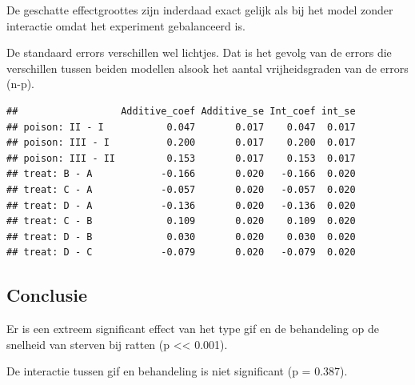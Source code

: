\documentclass[
  12pt,dutch]{book}
\newenvironment{Shaded}{\begin{snugshade}}{\end{snugshade}}
\newcommand{\AttributeTok}[1]{\textcolor[rgb]{0.13,0.29,0.53}{#1}}
\newcommand{\DecValTok}[1]{\textcolor[rgb]{0.00,0.00,0.81}{#1}}
\newcommand{\FunctionTok}[1]{\textcolor[rgb]{0.13,0.29,0.53}{\textbf{#1}}}
\newcommand{\NormalTok}[1]{#1}
\newcommand{\SpecialCharTok}[1]{\textcolor[rgb]{0.81,0.36,0.00}{\textbf{#1}}}
\theoremstyle{definition}
\theoremstyle{definition}
\theoremstyle{definition}
\theoremstyle{definition}
\theoremstyle{remark}
\begin{document}
De geschatte effectgroottes zijn inderdaad exact gelijk als bij het model zonder interactie omdat het experiment gebalanceerd is.

De standaard errors verschillen wel lichtjes.
Dat is het gevolg van de errors die verschillen tussen beiden modellen alsook het aantal vrijheidsgraden van de errors (n-p).

\begin{Shaded}
\end{Shaded}

\begin{verbatim}
##                  Additive_coef Additive_se Int_coef int_se
## poison: II - I           0.047       0.017    0.047  0.017
## poison: III - I          0.200       0.017    0.200  0.017
## poison: III - II         0.153       0.017    0.153  0.017
## treat: B - A            -0.166       0.020   -0.166  0.020
## treat: C - A            -0.057       0.020   -0.057  0.020
## treat: D - A            -0.136       0.020   -0.136  0.020
## treat: C - B             0.109       0.020    0.109  0.020
## treat: D - B             0.030       0.020    0.030  0.020
## treat: D - C            -0.079       0.020   -0.079  0.020
\end{verbatim}

\subsection{Conclusie}\label{conclusie-3}

Er is een extreem significant effect van het type gif en de behandeling op de snelheid van sterven bij ratten (p \textless\textless{} 0.001).

De interactie tussen gif en behandeling is niet significant (p = 0.387).
\end{document}
